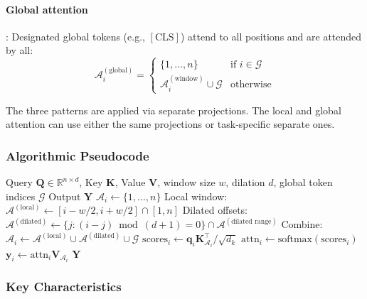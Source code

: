 \paragraph{Global attention}: Designated global tokens (e.g., $[\text{CLS}]$) attend to all positions and are attended by all:
\[
\mathcal{A}_i^{(\text{global})} = \begin{cases}
\{1, \ldots, n\} & \text{if } i \in \mathcal{G} \\
\mathcal{A}_i^{(\text{window})} \cup \mathcal{G} & \text{otherwise}
\end{cases}
\]

The three patterns are applied via separate projections. The local and global attention can use either the same projections or task-specific separate ones.

\subsubsection{Algorithmic Pseudocode}

\begin{algorithm}[H]
\caption{Longformer: Sliding Window + Dilated + Global}
\begin{algorithmic}[1]
\Require Query $\mathbf{Q} \in \mathbb{R}^{n \times d}$, Key $\mathbf{K}$, Value $\mathbf{V}$, window size $w$, dilation $d$, global token indices $\mathcal{G}$
\Ensure Output $\mathbf{Y}$
        \State $\mathcal{A}_i \gets \{1, \ldots, n\}$ 
    \Else
        \State Local window: $\mathcal{A}^{(\text{local})} \gets [i - w/2, i + w/2] \cap [1, n]$
        \State Dilated offsets: $\mathcal{A}^{(\text{dilated})} \gets \{j : (i-j) \bmod (d+1) = 0\} \cap \mathcal{A}^{(\text{dilated range})}$
        \State Combine: $\mathcal{A}_i \gets \mathcal{A}^{(\text{local})} \cup \mathcal{A}^{(\text{dilated})} \cup \mathcal{G}$
    \EndIf
    \State $\text{scores}_i \gets \mathbf{q}_i \mathbf{K}_{\mathcal{A}_i}^\top / \sqrt{d_k}$
    \State $\text{attn}_i \gets \text{softmax}(\text{scores}_i)$
    \State $\mathbf{y}_i \gets \text{attn}_i \mathbf{V}_{\mathcal{A}_i}$
\EndFor
\Return $\mathbf{Y}$
\end{algorithmic}
\end{algorithm}

\subsubsection{Key Characteristics}


